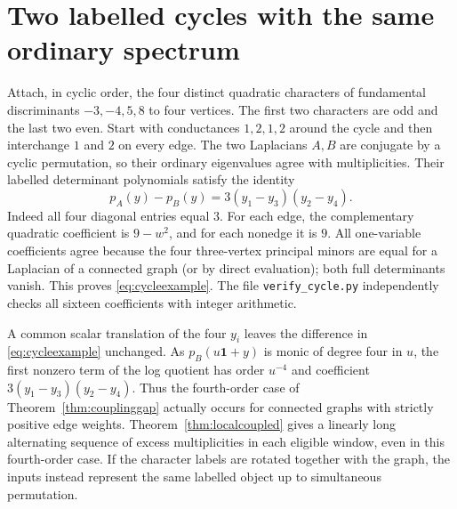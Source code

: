 \section{Two labelled cycles with the same ordinary spectrum}
Attach, in cyclic order, the four distinct quadratic characters of
fundamental discriminants $-3,-4,5,8$ to four vertices. The first two
characters are odd and the last two even. Start with conductances
$1,2,1,2$ around the cycle and then interchange $1$ and $2$ on every
edge. The two Laplacians $A,B$ are conjugate by a cyclic permutation, so
their ordinary eigenvalues agree with multiplicities. Their labelled
determinant polynomials satisfy the identity
\begin{equation}\label{eq:cycleexample}
 p_A(y)-p_B(y)=3(y_1-y_3)(y_2-y_4).
\end{equation}
Indeed all four diagonal entries equal $3$. For each edge, the complementary
quadratic coefficient is $9-w^2$, and for each nonedge it is $9$. All
one-variable coefficients agree because the four three-vertex principal
minors are equal for a Laplacian of a connected graph (or by direct
evaluation); both full determinants vanish. This proves
\eqref{eq:cycleexample}. The file \texttt{verify\_cycle.py} independently
checks all sixteen coefficients with integer arithmetic.

A common scalar translation of the four $y_i$ leaves the difference in
\eqref{eq:cycleexample} unchanged. As $p_B(u\mathbf1+y)$ is monic of degree
four in $u$, the first nonzero term of the log quotient has order $u^{-4}$
and coefficient $3(y_1-y_3)(y_2-y_4)$. Thus the fourth-order case of
Theorem~\ref{thm:couplinggap} actually occurs for connected graphs with
strictly positive edge weights. Theorem~\ref{thm:localcoupled} gives a
linearly long alternating sequence of excess multiplicities in each
eligible window, even in this fourth-order case. If the character labels
are rotated together with the graph, the inputs instead represent the
same labelled object up to simultaneous permutation.
